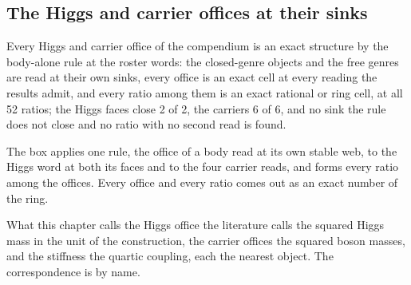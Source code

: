 \subsection{The Higgs and carrier offices at their sinks}\label{mod:VI-10-D538733-hcos-t1}
\begin{chtheorem}\label{box:VI-10-D538733-hcos-t1:1}
Every Higgs and carrier office of the compendium is an exact structure by the body-alone rule at the roster words: the closed-genre objects and the free genres are read at their own sinks, every office is an exact cell at every reading the results admit, and every ratio among them is an exact rational or ring cell, at all 52 ratios; the Higgs faces close 2 of 2, the carriers 6 of 6, and no sink the rule does not close and no ratio with no second read is found.
\end{chtheorem}
The box applies one rule, the office of a body read at its own stable web, to the Higgs word at both its faces and to the four carrier reads, and forms every ratio among the offices. Every office and every ratio comes out as an exact number of the ring.
\begin{chbridge}
What this chapter calls the Higgs office the literature calls the squared Higgs mass in the unit of the construction, the carrier offices the squared boson masses, and the stiffness the quartic coupling, each the nearest object. The correspondence is by name.
\end{chbridge}
